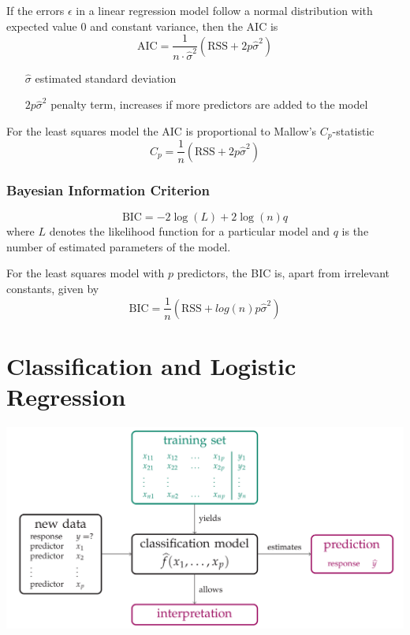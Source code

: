 \documentclass[11pt]{article}
\begin{document}
If the errors $\epsilon$ in a linear regression model follow a normal distribution with expected value $0$ and constant variance, then the AIC is
\begin{equation*}
	\text{AIC} = \frac{1}{n\cdot \hat{\sigma}^2} \left(\text{RSS} + 2p\hat{\sigma}^2\right)
\end{equation*}
\begin{itemize}[leftmargin=*, labelindent=1cm, labelsep=1cm]
	\item[$\hat{\sigma}$] estimated standard deviation
	\item[$2p\hat{\sigma}^2$] penalty term, increases if more predictors are added to the model
\end{itemize}
For the least squares model the AIC is proportional to Mallow's $C_p$-statistic
\begin{equation*}
	C_p = \frac{1}{n} (\text{RSS} + 2p\hat{\sigma}^2)
\end{equation*}

\subsubsection{Bayesian Information Criterion}
\begin{equation*}
	\text{BIC} = -2\log(L) + 2\log(n)q
\end{equation*}
where $L$ denotes the likelihood function for a particular model and $q$ is the number of estimated parameters of the model.

For the least squares model with $p$ predictors, the BIC is, apart from irrelevant constants, given by
\begin{equation*}
	\text{BIC} = \frac{1}{n}\left( \text{RSS} + log(n)p\hat{\sigma}^2 \right)
\end{equation*}

\section{Classification and Logistic Regression}
\begin{center}
	\includegraphics[width=0.6\linewidth]{img/classification}
\end{center}
\end{document}
